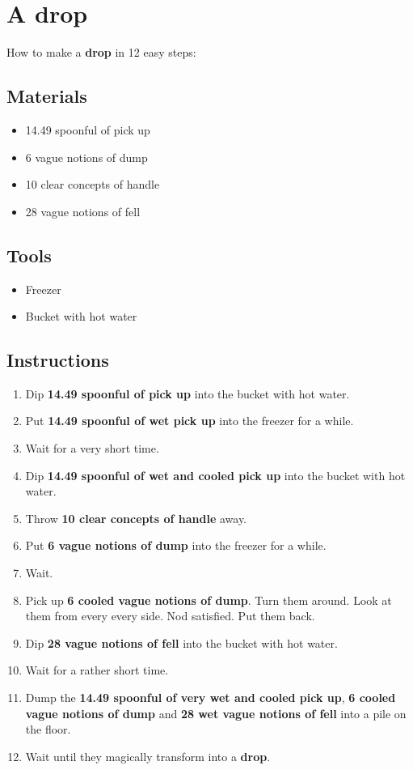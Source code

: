\documentclass{article}
\begin{document}
\section{A drop}How to make a \textbf{drop} in 12 easy steps:

\subsection{Materials}\begin{itemize}
\item 
14.49 spoonful of pick up
\item 
6 vague notions of dump
\item 
10 clear concepts of handle
\item 
28 vague notions of fell
\end{itemize}
\subsection{Tools}\begin{itemize}
\item 
Freezer
\item 
Bucket with hot water
\end{itemize}
\subsection{Instructions}\begin{enumerate}
\item 
Dip \textbf{14.49 spoonful of pick up} into the bucket with hot water.
\item 
Put \textbf{14.49 spoonful of wet pick up} into the freezer for a while.
\item 
Wait for a very short time.
\item 
Dip \textbf{14.49 spoonful of wet and cooled pick up} into the bucket with hot water.
\item 
Throw \textbf{10 clear concepts of handle} away.
\item 
Put \textbf{6 vague notions of dump} into the freezer for a while.
\item 
Wait.
\item 
Pick up \textbf{6 cooled vague notions of dump}. Turn them around. Look at them from every every side. Nod satisfied. Put them back.
\item 
Dip \textbf{28 vague notions of fell} into the bucket with hot water.
\item 
Wait for a rather short time.
\item 
Dump the \textbf{14.49 spoonful of very wet and cooled pick up}, \textbf{6 cooled vague notions of dump} and \textbf{28 wet vague notions of fell} into a pile on the floor.
\item 
Wait until they magically transform into a \textbf{drop}.
\end{enumerate}
\newpage
\end{document}
